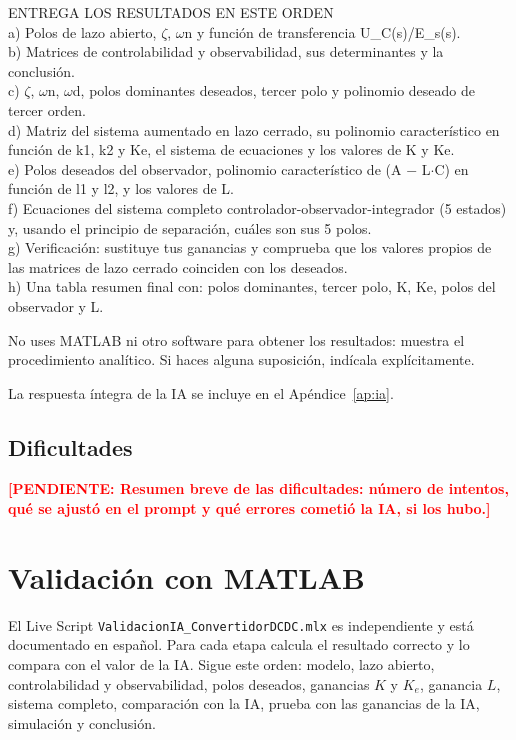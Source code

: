 \documentclass[conference,a4paper]{IEEEtran}
\newcommand{\pendiente}[1]{\textcolor{red}{\textbf{[PENDIENTE: #1]}}}
\begin{document}
\begin{framed}
\smallskip\noindent ENTREGA LOS RESULTADOS EN ESTE ORDEN\\
a) Polos de lazo abierto, $\zeta$, $\omega$n y función de transferencia U\_C(s)/E\_s(s).\\
b) Matrices de controlabilidad y observabilidad, sus determinantes y la conclusión.\\
c) $\zeta$, $\omega$n, $\omega$d, polos dominantes deseados, tercer polo y polinomio deseado de tercer orden.\\
d) Matriz del sistema aumentado en lazo cerrado, su polinomio característico en función de k1, k2 y Ke, el sistema de ecuaciones y los valores de K y Ke.\\
e) Polos deseados del observador, polinomio característico de (A $-$ L$\cdot$C) en función de l1 y l2, y los valores de L.\\
f) Ecuaciones del sistema completo controlador-observador-integrador (5 estados) y, usando el principio de separación, cuáles son sus 5 polos.\\
g) Verificación: sustituye tus ganancias y comprueba que los valores propios de las matrices de lazo cerrado coinciden con los deseados.\\
h) Una tabla resumen final con: polos dominantes, tercer polo, K, Ke, polos del observador y L.

\smallskip\noindent No uses MATLAB ni otro software para obtener los resultados: muestra el procedimiento analítico. Si haces alguna suposición, indícala explícitamente.
\end{framed}

La respuesta íntegra de la IA se incluye en el Apéndice~\ref{ap:ia}.

\subsection{Dificultades}
\pendiente{Resumen breve de las dificultades: número de intentos, qué se ajustó en el prompt y qué errores cometió la IA, si los hubo.}

\section{Validación con MATLAB}

El Live Script
\texttt{ValidacionIA\_Convertidor\-DCDC.mlx} es independiente y está documentado en español. Para cada etapa calcula el resultado correcto y lo compara con el valor de la IA. Sigue este orden: modelo, lazo abierto, controlabilidad y observabilidad, polos deseados, ganancias $K$ y $K_e$, ganancia $L$, sistema completo, comparación con la IA, prueba con las ganancias de la IA, simulación y conclusión.
\end{document}
